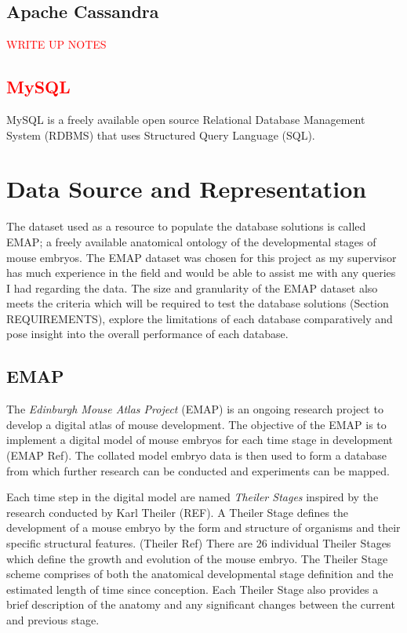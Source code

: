 \subsection{Apache Cassandra}\label{cassandra}
\textcolor{red}{WRITE UP NOTES}

\textcolor{red}{\subsection{MySQL}\label{mysql}}
MySQL is a freely available open source Relational Database Management System (RDBMS) that uses Structured Query Language (SQL).

\section{Data Source and Representation}
The dataset used as a resource to populate the database solutions is called EMAP; a freely available anatomical ontology of the developmental stages of mouse embryos. The EMAP dataset was chosen for this project as my supervisor has much experience in the field and would be able to assist me with any queries I had regarding the data. The size and granularity of the EMAP dataset also meets the criteria which will be required to test the database solutions (Section REQUIREMENTS), explore the limitations of each database comparatively and pose insight into the overall performance of each database.

\subsection{EMAP}
The \textit{Edinburgh Mouse Atlas Project} (EMAP) is an ongoing research project to develop a digital atlas of mouse development. The objective of the EMAP is to implement a digital model of mouse embryos for each time stage in development (EMAP Ref). The collated model embryo data is then used to form a database from which further research can be conducted and experiments can be mapped.
 
Each time step in the digital model are named \textit{Theiler Stages} inspired by the research conducted by Karl Theiler (REF). A Theiler Stage defines the development of a mouse embryo by the form and structure of organisms and their specific structural features. (Theiler Ref) There are 26 individual Theiler Stages which define the growth and evolution of the mouse embryo. The Theiler Stage scheme comprises of both the anatomical developmental stage definition and the estimated length of time since conception. Each Theiler Stage also provides a brief description of the anatomy and any significant changes between the current and previous stage.

